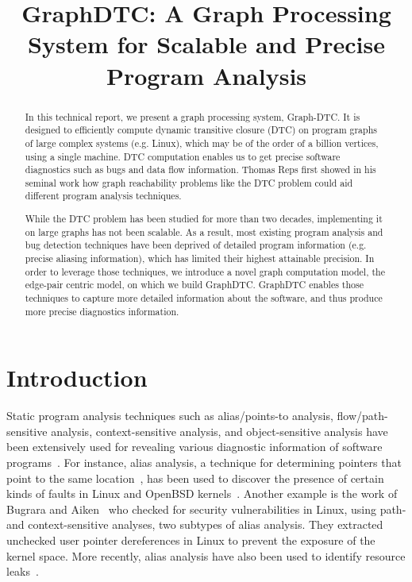 \documentclass[10pt,preprint]{sigplanconf}
\begin{document}
\title{GraphDTC: A Graph Processing System for Scalable and Precise Program Analysis} 
\maketitle


\begin{abstract}
In this technical report, we present a graph processing system, Graph-DTC. It is designed to efficiently compute dynamic transitive closure (DTC) on program graphs of large complex systems (e.g. Linux), which may be of the order of a billion vertices, using a single machine. DTC computation enables us to get precise software diagnostics such as bugs and data flow information. Thomas Reps first showed in his seminal work how graph reachability problems like the DTC problem could aid different program analysis techniques. 

While the DTC problem has been studied for more than two decades, implementing it on large graphs has not been scalable. As a result, most existing program analysis and bug detection techniques have been deprived of detailed program information (e.g. precise aliasing information), which has limited their highest attainable precision. In order to leverage those techniques, we introduce a novel graph computation model, the edge-pair centric model, on which we build GraphDTC. GraphDTC enables those techniques to capture more detailed information about the software, and thus produce more precise diagnostics information. 
\end{abstract}


\section{Introduction}

Static program analysis techniques such as alias/points-to analysis, flow/path-sensitive analysis, context-sensitive analysis, and object-sensitive analysis have been extensively used for revealing various diagnostic information of software programs~\cite{Xu}. For instance, alias analysis, a technique for determining pointers that point to the same location~\cite{alias}, has been used to discover the presence of certain kinds of faults in Linux and OpenBSD kernels~\cite{Chou, Palix}. Another example is the work of Bugrara and Aiken~\cite{aiken08} who checked for security vulnerabilities in Linux, using path- and context-sensitive analyses, two subtypes of alias analysis. They extracted unchecked user pointer dereferences in Linux to prevent the exposure of the kernel space. More recently, alias analysis have also been used to identify resource leaks~\cite{manu}.
\end{document}
